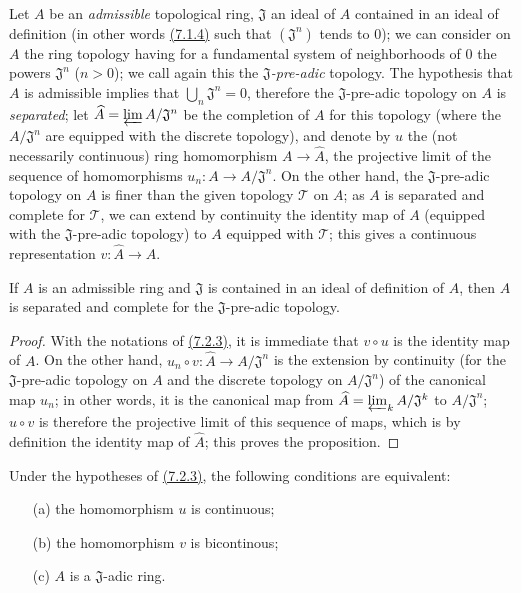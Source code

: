 \begin{env}[7.2.3]
\label{env-0.7.2.3}
Let $A$ be an {\em admissible} topological ring, $\mathfrak{J}$ an ideal of $A$
contained in an ideal of definition (in other words \hyperref[prop-0.7.1.4]{(7.1.4)} such that
$(\mathfrak{J}^n)$ tends to $0$); we can consider on $A$ the ring topology
having for a fundamental system of neighborhoods of $0$ the powers
$\mathfrak{J}^n$ ($n>0$); we call again this the {\em $\mathfrak{J}$-pre-adic}
topology. The hypothesis that $A$ is admissible implies that
$\bigcup_n\mathfrak{J}^n=0$, therefore the $\mathfrak{J}$-pre-adic topology on
$A$ is {\em separated}; let $\widehat{A}=\varprojlim A/\mathfrak{J}^n$ be the
completion of $A$ for this topology (where the $A/\mathfrak{J}^n$ are equipped
with the discrete topology), and denote by $u$ the (not necessarily continuous)
ring homomorphism $A\to\widehat{A}$, the projective limit of the sequence of
homomorphisms $u_n:A\to A/\mathfrak{J}^n$. On the other hand, the
$\mathfrak{J}$-pre-adic topology on $A$ is finer than the given topology
$\mathcal{T}$ on $A$; as $A$ is separated and complete for $\mathcal{T}$, we can
extend by continuity the identity map of $A$ (equipped with the
$\mathfrak{J}$-pre-adic topology) to $A$ equipped with $\mathcal{T}$; this
gives a continuous representation $v:\widehat{A}\to A$.
\end{env}

\begin{prop}[7.2.4]
\label{prop-0.7.2.4}
If $A$ is an admissible ring and $\mathfrak{J}$ is contained in an ideal of
definition of $A$, then $A$ is separated and complete for the
$\mathfrak{J}$-pre-adic topology.
\end{prop}

\begin{proof}
\label{proof-prop-0.7.2.4}
With the notations of \hyperref[env-0.7.2.3]{(7.2.3)}, it is immediate that
$v\circ u$ is the identity map of $A$. On the other hand,
$u_n\circ v:\widehat{A}\to A/\mathfrak{J}^n$ is the extension by continuity (for
the $\mathfrak{J}$-pre-adic topology on $A$ and the discrete topology on
$A/\mathfrak{J}^n$) of the canonical map $u_n$; in other words, it is the
canonical map from $\widehat{A}=\varprojlim_k A/\mathfrak{J}^k$ to
$A/\mathfrak{J}^n$; $u\circ v$ is therefore the projective limit of this
sequence of maps, which is by definition the identity map of
$\widehat{A}$; this proves the proposition.
\end{proof}

\begin{cor}[7.2.5]
\label{cor-0.7.2.5}
Under the hypotheses of \hyperref[env-0.7.2.3]{(7.2.3)}, the following conditions are
equivalent:
\begin{itemize}
  \item[{\rm(a)}] the homomorphism $u$ is continuous;
  \item[{\rm(b)}] the homomorphism $v$ is bicontinous;
  \item[{\rm(c)}] $A$ is a $\mathfrak{J}$-adic ring.
\end{itemize}
\end{cor}

